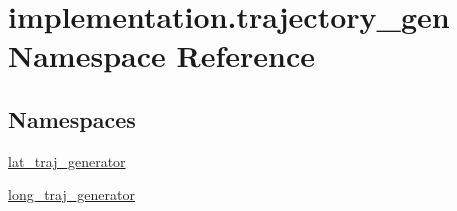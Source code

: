 \hypertarget{namespaceimplementation_1_1trajectory__gen}{}\section{implementation.\+trajectory\+\_\+gen Namespace Reference}
\label{namespaceimplementation_1_1trajectory__gen}
\subsection*{Namespaces}
\begin{DoxyCompactItemize}
\item 
 \hyperlink{namespaceimplementation_1_1trajectory__gen_1_1lat__traj__generator}{lat\+\_\+traj\+\_\+generator}
\item 
 \hyperlink{namespaceimplementation_1_1trajectory__gen_1_1long__traj__generator}{long\+\_\+traj\+\_\+generator}
\end{DoxyCompactItemize}

